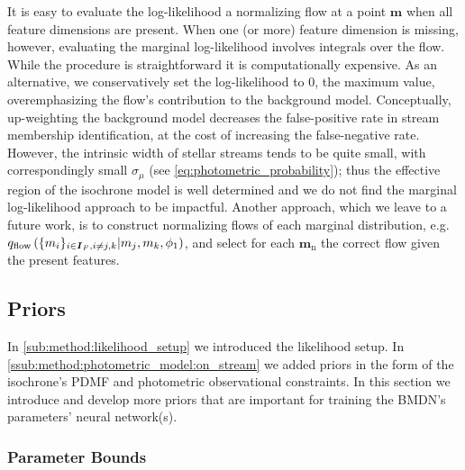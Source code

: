 \documentclass[twocolumn]{aastex631}
\newcommand{\mrm}[1]{\mathrm{#1}}
\newcommand{\mbs}[1]{\boldsymbol{#1}}
\newcommand{\nth}[1]{{#1}_{\mrm{n}}}  %
\begin{document}
            It is easy to evaluate the log-likelihood a normalizing flow at a
            point $\mbs{m}$ when all feature dimensions are present. When one
            (or more) feature dimension is missing, however, evaluating the
            marginal log-likelihood involves integrals over the flow. While the
            procedure is straightforward it is computationally expensive. As an
            alternative, we conservatively set the log-likelihood to $0$, the
            maximum value, overemphasizing the flow's contribution to the
            background model. Conceptually, up-weighting the background model
            decreases the false-positive rate in stream membership
            identification, at the cost of increasing the false-negative rate.
            However, the intrinsic width of stellar streams tends to be quite
            small, with correspondingly small $\sigma_\mu$ (see
            \autoref{eq:photometric_probability}); thus the effective region of
            the isochrone model is well determined and we do not find the
            marginal log-likelihood approach to be impactful. Another approach,
            which we leave to a future work, is to construct normalizing flows
            of each marginal distribution, e.g. $q_{\rm flow}\left(\{m_i\}_{i
            \in \mbs{I}_F, i \neq {j, k}} | m_j, m_k, \phi_1\right)$, and select
            for each $\nth{\mbs{m}}$ the correct flow given the present
            features.

    

    \subsection{Priors} \label{sub:methods:priors}

        In \autoref{sub:method:likelihood_setup} we introduced the likelihood
        setup. In \autoref{ssub:method:photometric_model:on_stream} we added
        priors in the form of the isochrone's PDMF and photometric observational
        constraints. In this section we introduce and develop more priors that
        are important for training the BMDN's parameters' neural network(s).

        \subsubsection{Parameter Bounds} \label{ssub:methods:priors:parameter_bounds}
\end{document}
